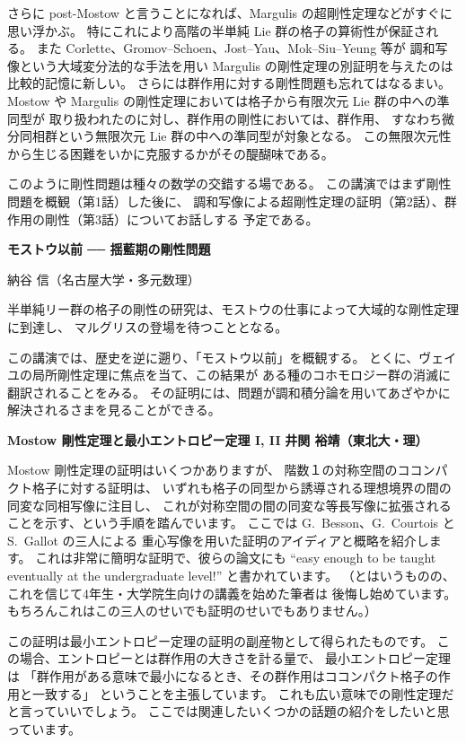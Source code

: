 \documentclass[uplatex,dvipdfmx]{jlreq}
\begin{document}
さらに post-Mostow と言うことになれば、Margulis の超剛性定理などがすぐに思い浮かぶ。
特にこれにより高階の半単純 Lie 群の格子の算術性が保証される。
また Corlette、Gromov--Schoen、Jost--Yau、Mok--Siu--Yeung 等が
調和写像という大域変分法的な手法を用い Margulis の剛性定理の別証明を与えたのは
比較的記憶に新しい。
さらには群作用に対する剛性問題も忘れてはなるまい。
Mostow や Margulis の剛性定理においては格子から有限次元 Lie 群の中への準同型が
取り扱われたのに対し、群作用の剛性においては、群作用、
すなわち微分同相群という無限次元 Lie 群の中への準同型が対象となる。
この無限次元性から生じる困難をいかに克服するかがその醍醐味である。

このように剛性問題は種々の数学の交錯する場である。
この講演ではまず剛性問題を概観（第1話）した後に、
調和写像による超剛性定理の証明（第2話）、群作用の剛性（第3話）についてお話しする
予定である。

\newpage

\begin{center}
  {\large\bfseries モストウ以前 ── 揺藍期の剛性問題}
\end{center}
\begin{flushright}
  納谷 信（名古屋大学・多元数理）
\end{flushright}

\medskip

半単純リー群の格子の剛性の研究は、モストウの仕事によって大域的な剛性定理に到達し、
マルグリスの登場を待つこととなる。

この講演では、歴史を逆に遡り、「モストウ以前」を概観する。
とくに、ヴェイユの局所剛性定理に焦点を当て、この結果が
ある種のコホモロジー群の消滅に翻訳されることをみる。
その証明には、問題が調和積分論を用いてあざやかに解決されるさまを見ることができる。

\newpage

\noindent
{\large\bfseries Mostow 剛性定理と最小エントロピー定理 I, II}
\hfill
{\large\bfseries 井関 裕靖（東北大・理）}

\medskip

Mostow 剛性定理の証明はいくつかありますが、
階数１の対称空間のココンパクト格子に対する証明は、
いずれも格子の同型から誘導される理想境界の間の同変な同相写像に注目し、
これが対称空間の間の同変な等長写像に拡張されることを示す、という手順を踏んでいます。
ここでは G.~Besson、G.~Courtois と S.~Gallot の三人による
重心写像を用いた証明のアイディアと概略を紹介します。
これは非常に簡明な証明で、彼らの論文にも
``easy enough to be taught eventually at the undergraduate level!''
と書かれています。
（とはいうものの、これを信じて4年生・大学院生向けの講義を始めた筆者は
後悔し始めています。もちろんこれはこの三人のせいでも証明のせいでもありません。）

この証明は最小エントロピー定理の証明の副産物として得られたものです。
この場合、エントロピーとは群作用の大きさを計る量で、
最小エントロピー定理は
「群作用がある意味で最小になるとき、その群作用はココンパクト格子の作用と一致する」
ということを主張しています。
これも広い意味での剛性定理だと言っていいでしょう。
ここでは関連したいくつかの話題の紹介をしたいと思っています。
\end{document}
